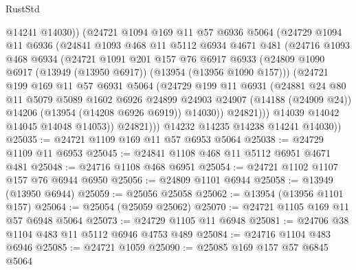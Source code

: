 \begin{lexlean}{RustStd}
\begin{coremodule}
                @14241
                @14030))
            (@24721
              @1094
              @169
              @11
              @57
              @6936
              @5064
              (@24729
                @1094
                @11
                @6936
                (@24841
                  @1093
                  @468
                  @11
                  @5112
                  @6934
                  @4671
                  @481
                  (@24716
                    @1093
                    @468
                    @6934
                    (@24721
                      @1091
                      @201
                      @157
                      @76
                      @6917
                      @6933
                      (@24809 @1090 @6917 (@13949 (@13950 @6917)) (@13954 (@13956 @1090 @157)))
                      (@24721
                        @199
                        @169
                        @11
                        @57
                        @6931
                        @5064
                        (@24729
                          @199
                          @11
                          @6931
                          (@24881
                            @24
                            @80
                            @11
                            @5079
                            @5089
                            @1602
                            @6926
                            @24899
                            @24903
                            @24907
                            (@14188 (@24909 @24))
                            @14206
                            (@13954 (@14208 @6926 @6919))
                            @14030))
                        @24821)))
                  @14039
                  @14042
                  @14045
                  @14048
                  @14053))
              @24821)))
        @14232
        @14235
        @14238
        @14241
        @14030))
@25035 := @24721 @1109 @169 @11 @57 @6953 @5064
@25038 := @24729 @1109 @11 @6953
@25045 := @24841 @1108 @468 @11 @5112 @6951 @4671 @481
@25048 := @24716 @1108 @468 @6951
@25054 := @24721 @1102 @1107 @157 @76 @6944 @6950
@25056 := @24809 @1101 @6944
@25058 := @13949 (@13950 @6944)
@25059 := @25056 @25058
@25062 := @13954 (@13956 @1101 @157)
@25064 := @25054 (@25059 @25062)
@25070 := @24721 @1105 @169 @11 @57 @6948 @5064
@25073 := @24729 @1105 @11 @6948
@25081 := @24706 @38 @1104 @483 @11 @5112 @6946 @4753 @489
@25084 := @24716 @1104 @483 @6946
@25085 := @24721 @1059
@25090 := @25085 @169 @157 @57 @6845 @5064

\end{coremodule}
\end{lexlean}
